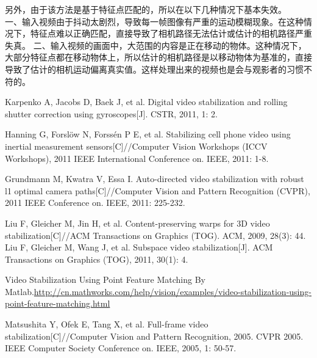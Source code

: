 \documentclass[journal, a4paper]{IEEEtran}
\begin{document}
    另外，由于该方法是基于特征点匹配的，所以在以下几种情况下基本失效。\\
    一、输入视频由于抖动太剧烈，导致每一帧图像有严重的运动模糊现象。在这种情况下，特征点难以正确匹配，直接导致了相机路径无法估计或估计的相机路径严重失真。
    二、输入视频的画面中，大范围的内容是正在移动的物体。这种情况下，大部分特征点都在移动物体上，所以估计的相机路径是以移动物体为基准的，直接导致了估计的相机运动偏离真实值。这样处理出来的视频也是会与观影者的习惯不符的。


\begin{thebibliography}{5}

Karpenko A, Jacobs D, Baek J, et al. Digital video stabilization and rolling shutter correction using gyroscopes[J]. CSTR, 2011, 1: 2.

  Hanning G, Forslöw N, Forssén P E, et al. Stabilizing cell phone video using inertial measurement sensors[C]//Computer Vision Workshops (ICCV Workshops), 2011 IEEE International Conference on. IEEE, 2011: 1-8.
    
    Grundmann M, Kwatra V, Essa I. Auto-directed video stabilization with robust l1 optimal camera paths[C]//Computer Vision and Pattern Recognition (CVPR), 2011 IEEE Conference on. IEEE, 2011: 225-232.
    
    Liu F, Gleicher M, Jin H, et al. Content-preserving warps for 3D video stabilization[C]//ACM Transactions on Graphics (TOG). ACM, 2009, 28(3): 44.
    Liu F, Gleicher M, Wang J, et al. Subspace video stabilization[J]. ACM Transactions on Graphics (TOG), 2011, 30(1): 4.
    
    Video Stabilization Using Point Feature Matching By Matlab.\url{http://cn.mathworks.com/help/vision/examples/video-stabilization-using-point-feature-matching.html}
    
    Matsushita Y, Ofek E, Tang X, et al. Full-frame video stabilization[C]//Computer Vision and Pattern Recognition, 2005. CVPR 2005. IEEE Computer Society Conference on. IEEE, 2005, 1: 50-57.
  

\end{thebibliography}

\end{document}
